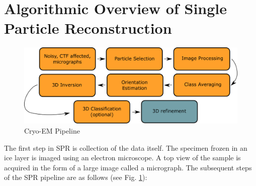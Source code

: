 \section{Algorithmic Overview of Single Particle Reconstruction}

\begin{figure}[t]
\begin{center}
\includegraphics[width=.9\columnwidth]{figures/cryoem_full_pipeline.pdf}
\end{center}
\caption{Cryo-EM Pipeline}
\label{fig:cryoem_full_pipeline}
\end{figure}

The first step in SPR is collection of the data itself. The specimen frozen in an ice layer is imaged using an electron microscope. A top view  of the sample is acquired in the form of a large image called a micrograph. The subsequent steps of the SPR pipeline are as follows (see Fig. \ref{fig:cryoem_full_pipeline}):

